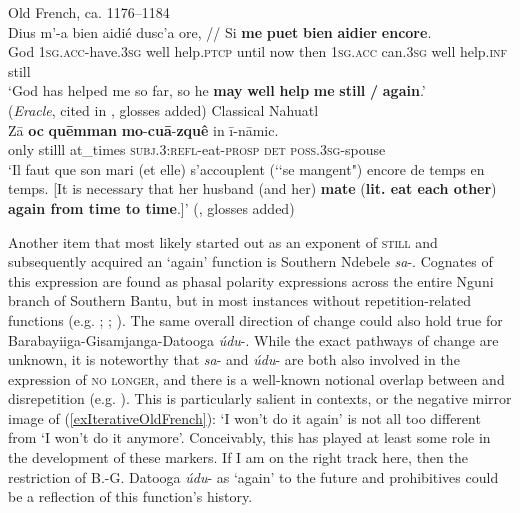 \begin{exe}
	\ex Old French, ca. 1176–1184 \label{exIterativeOldFrench}\\
	\gll Dius m'-a bien aidié {dusc'a ore}, // Si \textbf{me} \textbf{puet} \textbf{bien} \textbf{aidier} \textbf{encore}.\\
	God 1\textsc{sg}.\textsc{acc}-have.3\textsc{sg} well help.\textsc{ptcp} {until now} {} then 1\textsc{sg}.\textsc{acc} can.3\textsc{sg} well help.\textsc{inf} still\\
	\glt \lq God has helped me so far, so he \textbf{may} \textbf{well} \textbf{help} \textbf{me} \textbf{still} \textbf{/} \textbf{again}.'
	\\(\textit{Eracle}, cited in \cite[156]{MosegaardHansen2008},  glosses added)
	\ex Classical Nahuatl\label{exRepetitionNahuatlForgive}\\
		\gll Zā \textbf{oc} \textbf{quēmman} \textbf{mo}-\textbf{cuā}-\textbf{zquê} in ī-nāmic.\\
	only stilll at\_times \textsc{subj}.3:\textsc{refl}-eat-\textsc{prosp} \textsc{det} \textsc{poss}.3\textsc{sg}-spouse\\
	\glt \lq Il faut que son mari (et elle) s'accouplent (\lq\lq se mangent") encore de temps en temps. [It is necessary that her husband (and her) \textbf{mate} (\textbf{lit. eat each other}) \textbf{again from time to time}.]' (\cite[1265]{Launey1986}, glosses added)
\end{exe} 

Another item that most likely started out as an exponent of \textsc{still} and subsequently acquired an \lq again\rq{ }function is Southern Ndebele \mbox{\textit{sa}-}. Cognates of this expression are found as phasal polarity expressions across the entire Nguni branch of Southern Bantu, but in most instances without repetition-related functions (e.g. \cite{CranePersohn2021}; \cite[338–345]{PoulosMsimang1998}; \cite[192–195]{SavicThesis}). The same overall direction of change could also hold true for Barabayiiga-Gisamjanga-Datooga \mbox{\textit{údu}-}. While the exact pathways of change are unknown, it is noteworthy that \mbox{\textit{sa}-} and \mbox{\textit{údu}-} are both also involved in the expression of \textsc{no longer}, and there is a well-known notional overlap between  and disrepetition (e.g. \cite[92–93]{vanBaar1997}). This is particularly salient in  contexts, or the negative mirror image of (\ref{exIterativeOldFrench}): \lq I won't do it again' is not all too different from \lq I won't do it anymore'. Conceivably, this has played at least some role in the development of these markers. If I am on the right track here, then the restriction of B.-G. Datooga \mbox{\textit{údu}-} as \lq again\rq{ }to the future  and prohibitives could be a reflection of this function's history.

